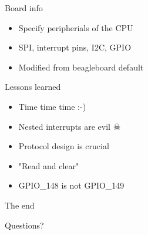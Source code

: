 \documentclass{beamer}
\begin{document}
\begin{frame}{Board info}
\begin{itemize}
	\item Specify peripherials of the CPU
	\item SPI, interrupt pins, I2C, GPIO
	\item Modified from beagleboard default
\end{itemize}
\end{frame}

\begin{frame}{Lessons learned}
\begin{itemize}
	\item Time time time :-)
	\item Nested interrupts are evil \(\skull\)
	\item Protocol design is crucial
	\item "Read and clear"
	\item GPIO\_148 is not GPIO\_149
\end{itemize}
\end{frame}

\begin{frame}{The end}
\begin{center}
Questions?
\end{center}
\end{frame}
\end{document}
